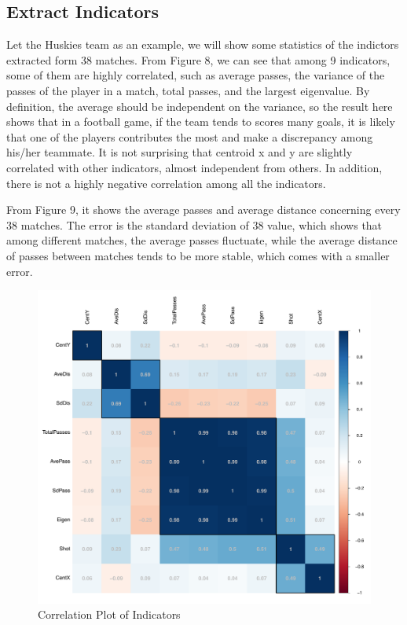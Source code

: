 \documentclass{mcmthesis}
\begin{document}
\subsection{Extract Indicators}
Let the Huskies team as an example, we will show some statistics of the indictors extracted form 38 matches. From Figure 8, we can see that among 9 indicators, some of them are highly correlated, such as average passes, the variance of the passes of the player in a match, total passes, and the largest eigenvalue. By definition, the average should be independent on the variance, so the result here shows that in a football game, if the team tends to scores many goals, it is likely that one of the players contributes the most and make a discrepancy among his/her teammate. It is not surprising that centroid x and y are slightly correlated with other indicators, almost independent from others. In addition, there is not a highly negative correlation among all the indicators.


From Figure 9, it shows the average passes and average distance concerning every 38 matches. The error is the standard deviation of 38 value, which shows that among different matches, the average passes fluctuate, while the average distance of passes between matches tends to be more stable, which comes with a smaller error. 

\begin{figure}[h!]
\begin{center}
\includegraphics[width=.45\textwidth]{F8f.pdf}
\caption{Correlation Plot of Indicators}
\end{center}
\end{figure}
\end{document}
